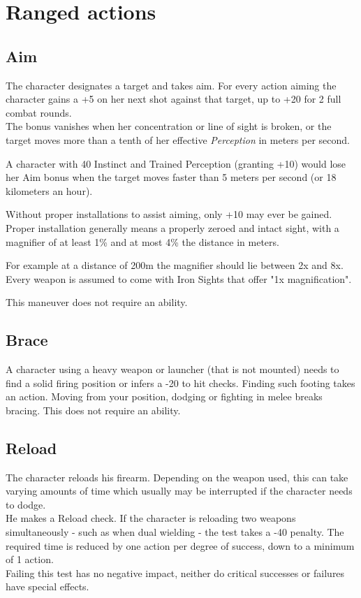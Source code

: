\section{Ranged actions}
\subsection*{Aim}
The character designates a target and takes aim.
For every action aiming the character
	gains a +5 on her next shot against that target,
	up to +20 for 2 full combat rounds.\\
The bonus vanishes when her concentration or line of sight is broken,
	or the target moves more than a tenth of her effective \emph{Perception} in meters per second.
\par
\begin{exampleblock}
	A character with 40 Instinct
		and Trained Perception (granting +10)
		would lose her Aim bonus when the target moves faster than
		5 meters per second
		(or 18 kilometers an hour).
\end{exampleblock}
Without proper installations to assist aiming, only +10 may ever be gained.
Proper installation generally means
	a properly zeroed and intact sight,
	with a magnifier of
	at least 1\%
	and at most 4\%
	the distance in meters.\\
\begin{exampleblock}
	For example at a distance of 200m the magnifier should lie between
		2x and 8x.
	\\%
	Every weapon is assumed to come with Iron Sights that offer "1x magnification".
\end{exampleblock}
This maneuver does not require an ability.
\subsection*{Brace}
A character using a heavy weapon or launcher (that is not mounted)
	needs to find a solid firing position or infers a -20 to hit checks.
Finding such footing takes an action.
Moving from your position, dodging or fighting in melee breaks bracing.
This does not require an ability.
\subsection*{Reload}
The character reloads his firearm. Depending on the weapon used, this can take varying amounts of time which usually may be interrupted if the character needs to dodge.\\
He makes a Reload check. If the character is reloading two weapons simultaneously - such as when dual wielding - the test takes a -40 penalty.
The required time is reduced by one action per degree of success,
	down to a minimum of 1 action.\\
Failing this test has no negative impact, neither do critical successes or failures have special effects.
